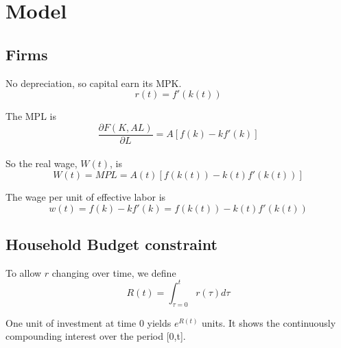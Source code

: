 \documentclass[12pt]{article}
\begin{document}
\section{Model}
\subsection{Firms}

No depreciation, so capital earn its MPK.
\begin{equation*}
r(t) = f'(k(t))
\end{equation*}

The MPL is 
\begin{equation*}
		\frac{\partial F(K, AL) }{\partial L } = A[f(k) - kf'(k)]
\end{equation*}
\noindent{}\\



So the real wage, $ W(t) $, is 
\begin{equation*}
		W(t) = MPL = A(t)[f(k(t)) - k(t)f'(k(t))]
\end{equation*}

The wage per unit of effective labor is
\begin{equation*}
w(t) =f(k) - kf'(k) =  f(k(t)) - k(t)f'(k(t))
\end{equation*}


\subsection{Household Budget constraint}



To allow $ r $ changing over time, we define 
\begin{equation*}
R(t) = \int_{\tau = 0}^{t} r(\tau)d \tau
\end{equation*}

One unit of investment at time 0 yields $ e^{R(t)} $ units. It shows the continuously
compounding interest over the period [0,t].
\end{document}
